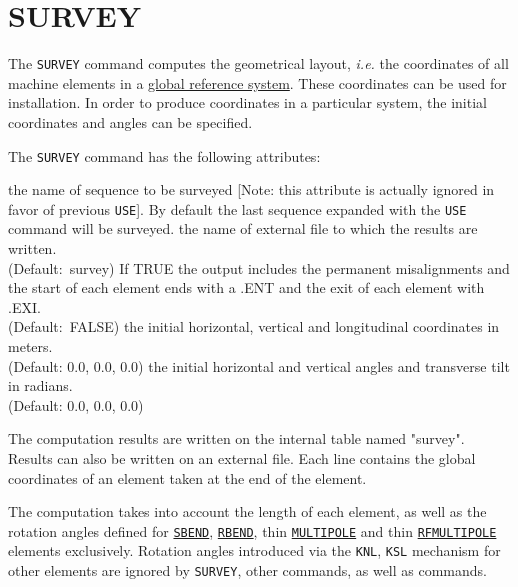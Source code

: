  
\chapter{SURVEY}
\label{chap:survey}

The \texttt{SURVEY} command computes the geometrical layout,
\textsl{i.e.} the coordinates of all machine elements in a 
\hyperref[sec:global-ref]{global reference system}. These
coordinates can be used for installation. In order to produce
coordinates in a particular system, the initial coordinates and angles
can be specified. 


The \texttt{SURVEY} command has the following attributes:
\begin{madlist}
   the name of sequence to be surveyed [Note: this attribute is actually ignored in favor of previous \texttt{USE}]. By default the
  last sequence expanded with the \texttt{USE} command will be surveyed.  
    the name of external file to which the results are
  written.\\ (Default:~survey)
    If TRUE the output includes the permanent misalignments
  and the start of each element ends with a .ENT and the exit of each element with .EXI.
  \\ (Default:~FALSE)
   the initial horizontal, vertical and longitudinal
  coordinates in meters.\\ (Default: 0.0, 0.0, 0.0) 
   the initial horizontal and vertical angles
  and transverse tilt in radians.\\ (Default: 0.0, 0.0, 0.0)
\end{madlist}

The computation results are written on the internal table named
"survey". Results can also be written on an external file. Each line
contains the global coordinates of an element taken at the end of the
element.

The computation takes into account the length of each element, as well
as the rotation angles defined for \hyperref[bend-sbend]{\texttt{SBEND}},
\hyperref[bend-rbend]{\texttt{RBEND}}, thin
\hyperref[sec:multipole]{\texttt{MULTIPOLE}} and thin
\hyperref[sec:rfmultipole]{\texttt{RFMULTIPOLE}} 
elements exclusively.  Rotation angles introduced via the \texttt{KNL},
\texttt{KSL} mechanism for other elements are ignored by
\texttt{SURVEY}, other \madx commands, as well as \ptc commands. 


